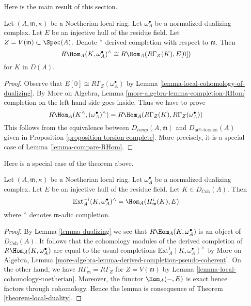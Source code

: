 \noindent
Here is the main result of this section.

\begin{theorem}
\label{theorem-local-duality}
Let $(A, \mathfrak m, \kappa)$ be a Noetherian local ring.
Let $\omega_A^\bullet$ be a normalized dualizing complex.
Let $E$ be an injective hull of the residue field.
Let $Z = V(\mathfrak m) \subset \Spec(A)$.
Denote ${}^\wedge$ derived completion with respect to $\mathfrak m$.
Then
$$
R\Hom_A(K, \omega_A^\bullet)^\wedge \cong R\Hom_A(R\Gamma_Z(K), E[0])
$$
for $K$ in $D(A)$.
\end{theorem}

\begin{proof}
Observe that $E[0] \cong R\Gamma_Z(\omega_A^\bullet)$ by
Lemma \ref{lemma-local-cohomology-of-dualizing}.
By More on Algebra, Lemma \ref{more-algebra-lemma-completion-RHom}
completion on the left hand side goes inside.
Thus we have to prove
$$
R\Hom_A(K^\wedge, (\omega_A^\bullet)^\wedge)
=
R\Hom_A(R\Gamma_Z(K), R\Gamma_Z(\omega_A^\bullet))
$$
This follows from the equivalence between
$D_{comp}(A, \mathfrak m)$ and $D_{\mathfrak m^\infty\text{-torsion}}(A)$
given in Proposition \ref{proposition-torsion-complete}.
More precisely, it is a special case of Lemma \ref{lemma-compare-RHom}.
\end{proof}

\noindent
Here is a special case of the theorem above.

\begin{lemma}
\label{lemma-special-case-local-duality}
Let $(A, \mathfrak m, \kappa)$ be a Noetherian local ring.
Let $\omega_A^\bullet$ be a normalized dualizing complex.
Let $E$ be an injective hull of the residue field.
Let $K \in D_{\textit{Coh}}(A)$. Then
$$
\text{Ext}^{-i}_A(K, \omega_A^\bullet)^\wedge =
\Hom_A(H^i_{\mathfrak m}(K), E)
$$
where ${}^\wedge$ denotes $\mathfrak m$-adic completion.
\end{lemma}

\begin{proof}
By Lemma \ref{lemma-dualizing} we see that $R\Hom_A(K, \omega_A^\bullet)$
is an object of $D_{\textit{Coh}}(A)$.
It follows that the cohomology modules of the derived completion
of $R\Hom_A(K, \omega_A^\bullet)$ are equal to the usual completions
$\text{Ext}^i_A(K, \omega_A^\bullet)^\wedge$ by
More on Algebra, Lemma
\ref{more-algebra-lemma-derived-completion-pseudo-coherent}.
On the other hand, we have $R\Gamma_{\mathfrak m} = R\Gamma_Z$
for $Z = V(\mathfrak m)$ by Lemma \ref{lemma-local-cohomology-noetherian}.
Moreover, the functor $\Hom_A(-, E)$ is exact hence
factors through cohomology.
Hence the lemma is consequence of
Theorem \ref{theorem-local-duality}.
\end{proof}






